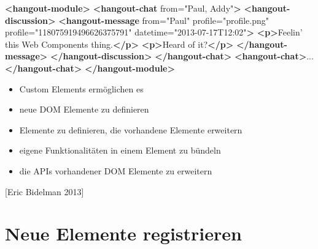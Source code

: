 \documentclass[11pt,a4paper]{report}
\newenvironment{Shaded}{}{}
\newcommand{\KeywordTok}[1]{\textcolor[rgb]{0.00,0.44,0.13}{\textbf{{#1}}}}
\newcommand{\StringTok}[1]{\textcolor[rgb]{0.25,0.44,0.63}{{#1}}}
\newcommand{\OtherTok}[1]{\textcolor[rgb]{0.00,0.44,0.13}{{#1}}}
\newcommand{\NormalTok}[1]{{#1}}
\providecommand{\tightlist}{%
  \setlength{\itemsep}{0pt}\setlength{\parskip}{0pt}}
\begin{document}
\begin{Shaded}
\begin{Highlighting}[]
\KeywordTok{<hangout-module>}
  \KeywordTok{<hangout-chat}\OtherTok{ from=}\StringTok{"Paul, Addy"}\KeywordTok{>}
    \KeywordTok{<hangout-discussion>}
      \KeywordTok{<hangout-message}\OtherTok{ from=}\StringTok{"Paul"}\OtherTok{ profile=}\StringTok{"profile.png"}
\OtherTok{          profile=}\StringTok{"118075919496626375791"}\OtherTok{ datetime=}\StringTok{"2013-07-17T12:02"}\KeywordTok{>}
        \KeywordTok{<p>}\NormalTok{Feelin' this Web Components thing.}\KeywordTok{</p>}
        \KeywordTok{<p>}\NormalTok{Heard of it?}\KeywordTok{</p>}
      \KeywordTok{</hangout-message>}
    \KeywordTok{</hangout-discussion>}
  \KeywordTok{</hangout-chat>}
  \KeywordTok{<hangout-chat>}\NormalTok{...}\KeywordTok{</hangout-chat>}
\KeywordTok{</hangout-module>}
\end{Highlighting}
\end{Shaded}

\begin{itemize}
\tightlist
\item
  Custom Elements ermöglichen es
\item
  neue DOM Elemente zu definieren
\item
  Elemente zu definieren, die vorhandene Elemente erweitern
\item
  eigene Funktionalitäten in einem Element zu bündeln
\item
  die APIs vorhandener DOM Elemente zu erweitern
\end{itemize}

{[}Eric Bidelman 2013{]}

\section{Neue Elemente registrieren}\label{neue-elemente-registrieren}
\end{document}
